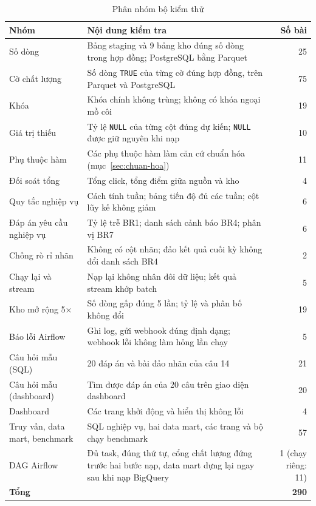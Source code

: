 \begin{table}[htbp]
\centering
\footnotesize
\begin{tabularx}{\textwidth}{|p{3.2cm}|X|r|}
\hline
\textbf{Nhóm} & \textbf{Nội dung kiểm tra} & \textbf{Số bài} \\ \hline
Số dòng & Bảng staging và 9 bảng kho đúng số dòng trong hợp đồng; PostgreSQL bằng Parquet & 25 \\ \hline
Cờ chất lượng & Số dòng \texttt{TRUE} của từng cờ đúng hợp đồng, trên Parquet và PostgreSQL & 75 \\ \hline
Khóa & Khóa chính không trùng; không có khóa ngoại mồ côi & 19 \\ \hline
Giá trị thiếu & Tỷ lệ \texttt{NULL} của từng cột đúng dự kiến; \texttt{NULL} được giữ nguyên khi nạp & 10 \\ \hline
Phụ thuộc hàm & Các phụ thuộc hàm làm căn cứ chuẩn hóa (mục~\ref{sec:chuan-hoa}) & 11 \\ \hline
Đối soát tổng & Tổng click, tổng điểm giữa nguồn và kho & 4 \\ \hline
Quy tắc nghiệp vụ & Cách tính tuần; bảng tiến độ đủ các tuần; cột lũy kế không giảm & 6 \\ \hline
Đáp án yêu cầu nghiệp vụ & Tỷ lệ trễ BR1; danh sách cảnh báo BR4; phân vị BR7 & 6 \\ \hline
Chống rò rỉ nhãn & Không có cột nhãn; đảo kết quả cuối kỳ không đổi danh sách BR4 & 2 \\ \hline
Chạy lại và stream & Nạp lại không nhân đôi dữ liệu; kết quả stream khớp batch & 5 \\ \hline
Kho mở rộng 5$\times$ & Số dòng gấp đúng 5 lần; tỷ lệ và phân bố không đổi & 19 \\ \hline
Báo lỗi Airflow & Ghi log, gửi webhook đúng định dạng; webhook lỗi không làm hỏng lần chạy & 5 \\ \hline
Câu hỏi mẫu (SQL) & 20 đáp án và bài đảo nhãn của câu 14 & 21 \\ \hline
Câu hỏi mẫu (dashboard) & Tìm được đáp án của 20 câu trên giao diện dashboard & 20 \\ \hline
Dashboard & Các trang khởi động và hiển thị không lỗi & 4 \\ \hline
Truy vấn, data mart, benchmark & SQL nghiệp vụ, hai data mart, các trang và bộ chạy benchmark & 57 \\ \hline
DAG Airflow & Đủ task, đúng thứ tự, cổng chất lượng đứng trước hai bước nạp, data mart dựng lại ngay sau khi nạp BigQuery & 1 (chạy riêng: 11) \\ \hline
\textbf{Tổng} & & \textbf{290} \\ \hline
\end{tabularx}
\caption{Phân nhóm bộ kiểm thử}
\label{tab:nhom-kiem-thu}
\end{table}

